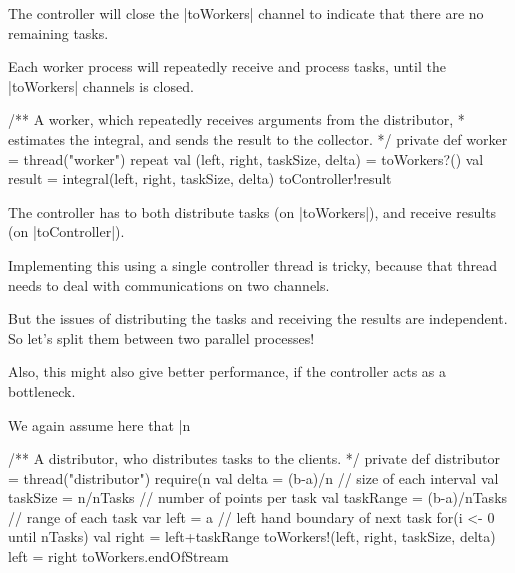
\begin{slide}

The controller will close the |toWorkers| channel to indicate that there are
no remaining tasks.

Each  worker process will repeatedly receive and process tasks, until the
|toWorkers|  channels is closed.  
%
\begin{scala}
  /** A worker, which repeatedly receives arguments from the distributor,
    * estimates the integral, and sends the result to the collector. */
  private def worker = thread("worker"){
    repeat{
      val (left, right, taskSize, delta) = toWorkers?() 
      val result = integral(left, right, taskSize, delta)
      toController!result
    }
  }
\end{scala}
\end{slide}


\begin{slide}

The controller has to both distribute tasks (on |toWorkers|), and receive
results (on |toController|).

Implementing this using a single controller thread is tricky, because that
thread needs to deal with communications on two channels. 

But the issues of distributing the tasks and receiving the results are
independent.  So let's split them between two parallel processes!  

Also, this might also give better performance, if the controller acts as a
bottleneck.
\end{slide}


\begin{slide}

We again assume here that |n%
\begin{scala}
  /** A distributor, who distributes tasks to the clients. */
  private def distributor = thread("distributor"){
    require(n%
    val delta = (b-a)/n               // size of each interval
    val taskSize = n/nTasks          // number of points per task
    val taskRange = (b-a)/nTasks // range of each task
    var left = a                      // left hand boundary of next task
    for(i <- 0 until nTasks){
      val right = left+taskRange
      toWorkers!(left, right, taskSize, delta)
      left = right
    }
    toWorkers.endOfStream
  }
\end{scala}
\end{slide}

